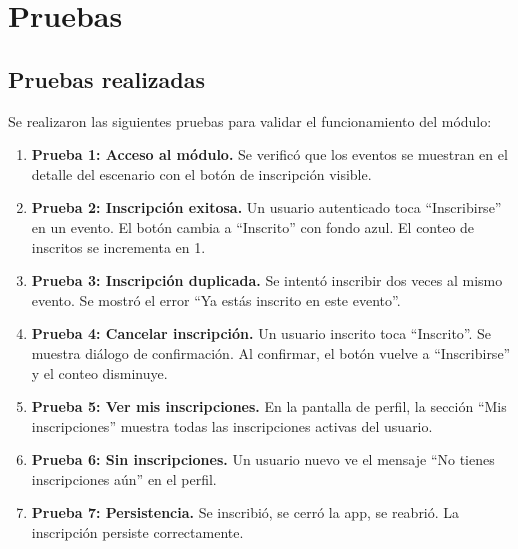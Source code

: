 
\section{Pruebas}

\subsection{Pruebas realizadas}

Se realizaron las siguientes pruebas para validar el funcionamiento
del m\'odulo:

\begin{enumerate}
  \item \textbf{Prueba 1: Acceso al m\'odulo.} Se verific\'o que
    los eventos se muestran en el detalle del escenario con el bot\'on
    de inscripci\'on visible.

  \item \textbf{Prueba 2: Inscripci\'on exitosa.} Un usuario
    autenticado toca ``Inscribirse'' en un evento. El bot\'on cambia
    a ``Inscrito'' con fondo azul. El conteo de inscritos se
    incrementa en 1.

  \item \textbf{Prueba 3: Inscripci\'on duplicada.} Se intent\'o
    inscribir dos veces al mismo evento. Se mostr\'o el error
    ``Ya est\'as inscrito en este evento''.

  \item \textbf{Prueba 4: Cancelar inscripci\'on.} Un usuario
    inscrito toca ``Inscrito''. Se muestra di\'alogo de
    confirmaci\'on. Al confirmar, el bot\'on vuelve a
    ``Inscribirse'' y el conteo disminuye.

  \item \textbf{Prueba 5: Ver mis inscripciones.} En la pantalla
    de perfil, la secci\'on ``Mis inscripciones'' muestra todas las
    inscripciones activas del usuario.

  \item \textbf{Prueba 6: Sin inscripciones.} Un usuario nuevo
    ve el mensaje ``No tienes inscripciones a\'un'' en el perfil.

  \item \textbf{Prueba 7: Persistencia.} Se inscribió, se cerr\'o
    la app, se reabrió. La inscripci\'on persiste correctamente.


\end{enumerate}
